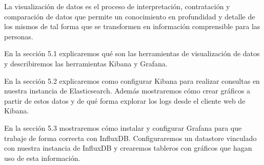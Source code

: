 La visualización de datos es el proceso de interpretación, contratación y comparación de datos que permite un conocimiento en profundidad y detalle de los mismos de tal forma que se transformen en información comprensible para las personas.

En la sección 5.1 explicaremos qué son las herramientas de visualización de datos y describiremos las herramientas Kibana y Grafana.

En la sección 5.2 explicaremos como configurar Kibana para realizar consultas en nuestra instancia de Elasticsearch. Además mostraremos cómo crear gráficos a partir de estos datos y de qué forma explorar los logs desde el cliente web de Kibana.

En la sección 5.3 mostraremos cómo instalar y configurar Grafana para que trabaje de forma correcta con InfluxDB. Configuraremos un datastore vinculado con nuestra instancia de InfluxDB y crearemos tableros con gráficos que hagan uso de esta información.
